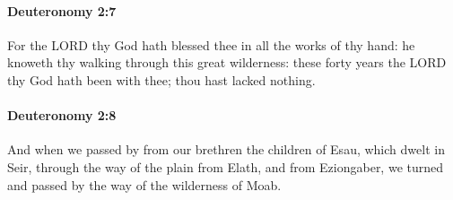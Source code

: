 		\paragraph{Deuteronomy 2:7} %
			\label{DEUTERONOMY-2-7}

			For the LORD thy God hath blessed thee in all the works of thy hand: he knoweth thy walking through this great wilderness: these forty years the LORD thy God hath been with thee; thou hast lacked nothing.


		\paragraph{Deuteronomy 2:8} %
			\label{DEUTERONOMY-2-8}

			And when we passed by from our brethren the children of Esau, which dwelt in Seir, through the way of the plain from Elath, and from Eziongaber, we turned and passed by the way of the wilderness of Moab.

